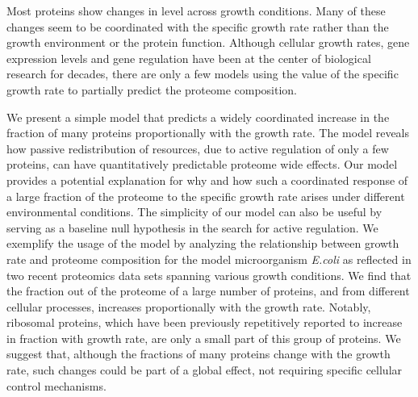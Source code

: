 Most proteins show changes in level across growth conditions.
Many of these changes seem to be coordinated with the specific growth rate rather than the growth environment or the protein function.
Although cellular growth rates, gene expression levels and gene regulation have been at the center of biological research for decades, there are only a few models using the value of the specific growth rate to partially predict the proteome composition.

We present a simple model that predicts a widely coordinated increase in the fraction of many proteins proportionally with the growth rate.
The model reveals how passive redistribution of resources, due to active regulation of only a few proteins, can have quantitatively predictable proteome wide effects.
Our model provides a potential explanation for why and how such a coordinated response of a large fraction of the proteome to the specific growth rate arises under different environmental conditions.
The simplicity of our model can also be useful by serving as a baseline null hypothesis in the search for active regulation.
We exemplify the usage of the model by analyzing the relationship between growth rate and proteome composition for the model microorganism \emph{E.coli} as reflected in two recent proteomics data sets spanning various growth conditions.
We find that the fraction out of the proteome of a large number of proteins, and from different cellular processes, increases proportionally with the growth rate.
Notably, ribosomal proteins, which have been previously repetitively reported to increase in fraction with growth rate, are only a small part of this group of proteins.
We suggest that, although the fractions of many proteins change with the growth rate, such changes could be part of a global effect, not requiring specific cellular control mechanisms.